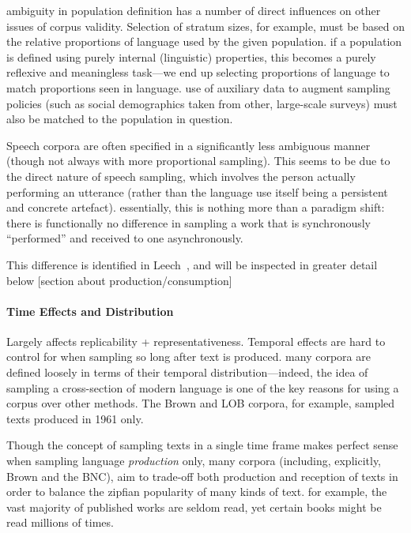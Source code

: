 ambiguity in population definition has a number of direct influences on other issues of corpus validity. Selection of stratum sizes, for example, must be based on the relative proportions of language used by the given population. if a population is defined using purely internal (linguistic) properties, this becomes a purely reflexive and meaningless task---we end up selecting proportions of language to match proportions seen in language.  use of auxiliary data to augment sampling policies (such as social demographics taken from other, large-scale surveys) must also be matched to the population in question.


Speech corpora are often specified in a significantly less ambiguous manner (though not always with more proportional sampling). This seems to be due to the direct nature of speech sampling, which involves the person actually performing an utterance (rather than the language use itself being a persistent and concrete artefact).  essentially, this is nothing more than a paradigm shift: there is functionally no difference in sampling a work that is synchronously ``performed'' and received to one asynchronously.

This difference is identified in Leech~\cite{leech2006new}, and will be inspected in greater detail below [section about production/consumption]









\paragraph{ Time Effects and Distribution }
Largely affects replicability + representativeness. Temporal effects are hard to control for when sampling so long after text is produced. 
many corpora are defined loosely in terms of their temporal distribution---indeed, the idea of sampling a cross-section of modern language is one of the key reasons for using a corpus over other methods. The Brown and LOB corpora, for example, sampled texts produced in 1961 only.

Though the concept of sampling texts in a single time frame makes perfect sense when sampling language \textit{production} only, many corpora (including, explicitly, Brown and the BNC), aim to trade-off both production and reception of texts in order to balance the zipfian popularity of many kinds of text.  for example, the vast majority of published works are seldom read, yet certain books might be read millions of times.

